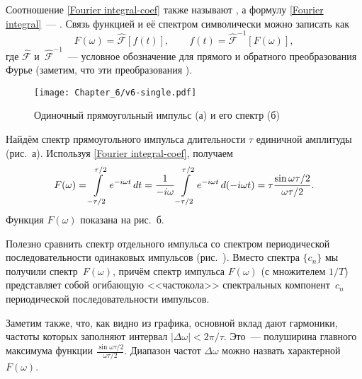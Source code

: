 Соотношение \eqref{Fourier integral-coef} также называют
, а формулу \eqref{Fourier integral}~---
.
Связь функцией и её спектром символически можно записать как
\begin{equation*}
F(\omega) = \hat{\mathcal{F}}[f(t)],\qquad 
f(t) = \hat{\mathcal{F}}^{-1}[F(\omega)],
\end{equation*}
где $\hat{\mathcal{F}}$ и~$\hat{\mathcal{F}}^{-1}$~--- условное обозначение
для прямого и обратного преобразования Фурье (заметим, что
эти преобразования ).

\begin{figure}[h!]
    \centering\texttt{[image: Chapter\_6/v6-single.pdf]}
    \caption{Одиночный прямоугольный импульс (а) и его спектр (б)}
\end{figure}

\begin{lab:example}\label{example:square}
Найдём спектр прямоугольного импульса длительности $\tau$
единичной амплитуды (рис.~а). Используя
\eqref{Fourier integral-coef}, получаем
\begin{equation}
    \eqmark{spectrum-impulse}
    F(\omega)=\int\limits_{-\tau/2}^{\tau/2} e^{-i\omega
t}\,dt=\frac{1}{-i\omega}\int\limits_{-\tau/2}^{\tau/2} e^{-i\omega t}\,
d(-i\omega t)=\tau\frac{\sin\omega\tau/2}{\omega\tau/2}.
\end{equation}
Функция $F(\omega)$ показана на рис.~б.

Полезно сравнить спектр отдельного импульса со спектром периодической
последовательности одинаковых импульсов (рис.~).
Вместо  спектра $\{c_n\}$ мы получили
 спектр~$F(\omega)$, причём
спектр импульса $F(\omega)$ (с множителем $1/T$) представляет собой
огибающую <<частокола>> спектральных компонент~$c_n$
периодической последовательности импульсов.

Заметим также, что, как видно из графика, основной вклад дают гармоники, частоты
которых заполняют интервал $|\Delta\omega|<2\pi/\tau$. Это~--- полуширина
главного максимума функции $\frac{\sin\omega\tau/2}{\omega\tau/2}$. Диапазон
частот $\Delta\omega$ можно назвать характерной 
$F(\omega)$.
\end{lab:example}


\label{sec:indeterminacy}

